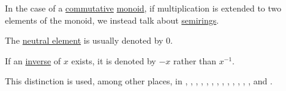 \begin{concept}
\begin{thmenum}
    In the case of a \hyperref[def:binary_operation/commutative]{commutative} \hyperref[def:monoid]{monoid}, if multiplication is extended to two elements of the monoid, we instead talk about \hyperref[def:semiring]{semirings}.

     The \hyperref[def:monoid]{neutral element} is usually denoted by \( 0 \).

     If an \hyperref[def:monoid_inverse]{inverse} of \( x \) exists, it is denoted by \( -x \) rather than \( x^{-1} \).
  \end{thmenum}
\end{concept}
\begin{comments}
  \item This distinction is used, among other places, in
  \cite[def. A I.1]{Bourbaki1998Algebra1to3},
  \cite[3]{Lang2002Algebra},
  \cite[228]{Rotman2017AdvancedModernAlgebraPart2},
  \cite[119]{Knapp2016BasicAlgebra},
  \cite[20]{Yoshida1980FunctionalAnalysis},
  \cite[\S 8.3]{Schechter1997AnalysisHandbook},
  \cite[107]{Проскуряков1951ТеоретическиеОсновыАрифметики},
  \cite[33]{Зорич2019АнализЧасть1},
  \cite[14]{Винберг2014КурсАлгебры},
  \cite{Шафаревич1999ОсновныеПонятияАлгебры},
  \cite[138]{Кострикин2000АлгебраЧасть1},
  \cite[89]{ЦаленкоШульгейфер1974ОсновыТеорииКатегорий},
  \cite[126]{БелоусовТкачёв2004ДискретнаяМатематика},
  \cite[378]{Обрешков1962ВисшаАлгебра} and
  \cite[74]{ГеновМиховскиМоллов1991Алгебра}.
\end{comments}

